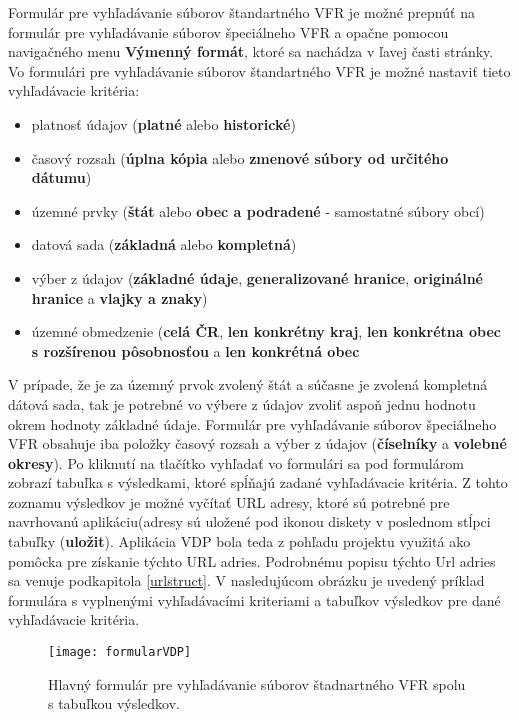 Formulár pre vyhľadávanie súborov štandartného VFR je možné prepnúť na formulár pre vyhľadávanie súborov špeciálneho VFR a opačne pomocou navigačného menu {\bf Výmenný formát}, ktoré sa nachádza v ľavej časti stránky. Vo formulári pre vyhľadávanie súborov štandartného VFR je možné nastaviť tieto vyhľadávacie kritéria: 
\begin{itemize}
\item platnosť údajov ({\bf platné} alebo {\bf historické})
\item časový rozsah ({\bf úplna kópia} alebo {\bf zmenové súbory od určitého dátumu})
\item územné prvky ({\bf štát } alebo {\bf obec a podradené} - samostatné súbory obcí)
\item datová sada ({\bf základná} alebo {\bf kompletná})
\item výber z údajov ({\bf základné údaje}, {\bf generalizované hranice}, {\bf originálné hranice} a {\bf vlajky a znaky})
\item územné obmedzenie ({\bf celá ČR}, {\bf len konkrétny kraj}, {\bf len konkrétna obec s rozšírenou pôsobnosťou} a {\bf len konkrétná obec}
\end{itemize}
V prípade, že je za územný prvok zvolený štát  a súčasne je zvolená kompletná dátová sada, tak je potrebné vo výbere z údajov zvoliť aspoň jednu hodnotu okrem hodnoty základné údaje.
Formulár pre vyhľadávanie súborov špeciálneho VFR obsahuje iba položky časový rozsah a výber z údajov ({\bf číselníky} a {\bf volebné okresy}). Po kliknutí na tlačítko vyhľadať vo formulári sa pod formulárom zobrazí tabuľka s výsledkami, ktoré spĺňajú zadané vyhľadávacie kritéria. Z tohto zoznamu výsledkov je možné vyčítať URL adresy, ktoré sú potrebné pre navrhovanú aplikáciu(adresy sú uložené pod ikonou diskety v poslednom stĺpci tabuľky ({\bf uložit}). Aplikácia VDP bola teda z pohľadu projektu  využitá ako pomôcka pre získanie týchto URL adries. Podrobnému popisu týchto Url adries sa venuje podkapitola \ref{urlstruct}. V nasledujúcom obrázku je uvedený príklad formulára s vyplnenými vyhľadávacími kriteriami a tabuľkov výsledkov pre dané vyhľadávacie kritéria.
\begin{figure}[H]
\texttt{[image: formularVDP]}
\centering
\caption{Hlavný formulár pre vyhľadávanie súborov štadnartného VFR spolu s tabuľkou výsledkov.}
\end{figure}
